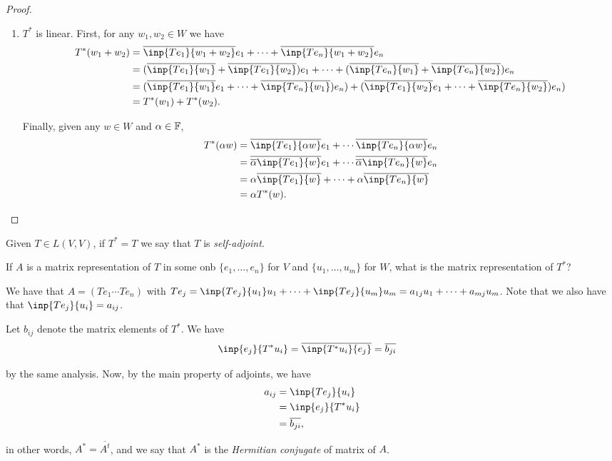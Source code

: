 \begin{proof}
\begin{enumerate}[{Step} 1)]
    \item $T^*$ is linear. First, for any $w_1,w_2\in W$ we have
    \begin{align*}
      T^*(w_1+w_2) &= \overline{\inp{Te_1}{w_1+w_2}}e_1 + \cdots + \overline{\inp{Te_n}{w_1+w_2}}e_n\\
      &= (\overline{\inp{Te_1}{w_1}}+\overline{\inp{Te_1}{w_2}})e_1 + \cdots + (\overline{\inp{Te_n}{w_1}}+\overline{\inp{Te_n}{w_2}})e_n\\
      &= (\overline{\inp{Te_1}{w_1}}e_1+\cdots+\overline{\inp{Te_n}{w_1}})e_n) + (\overline{\inp{Te_1}{w_2}}e_1+\cdots+\overline{\inp{Te_n}{w_2}})e_n)\\
      &= T^*(w_1) + T^*(w_2).
    \end{align*}

    Finally, given any $w\in W$ and $\alpha\in\mathbb{F}$,
    \begin{align*}
      T^*(\alpha w) &= \overline{\inp{Te_1}{\alpha w}}e_1 + \cdots \overline{\inp{Te_n}{\alpha w}}e_n\\
      &= \overline{\overline{\alpha} \inp{Te_1}{w}}e_1 + \cdots \overline{\overline{\alpha} \inp{Te_n}{w}}e_n\\
      &= \alpha\overline{\inp{Te_1}{w}} + \cdots + \alpha\overline{\inp{Te_n}{w}}\\
      &= \alpha T^*(w).
    \end{align*}
  \end{enumerate}
\end{proof}


\begin{definition}
  Given $T\in L(V,V)$, if $T^*=T$ we say that $T$ is \emph{self-adjoint}.
\end{definition}

\begin{question}
  If $A$ is a matrix representation of $T$ in some onb $\{e_1,\dots,e_n\}$ for $V$ and $\{u_1,\dots,u_m\}$ for $W$, what is the matrix representation of $T^*$?
\end{question}
\begin{answer}
  We have that $A=(Te_1 \cdots Te_n)$ with $Te_j=\inp{Te_j}{u_1}u_1 + \cdots + \inp{Te_j}{u_m}u_m =a_{1j}u_1 + \cdots + a_{mj}u_m$. Note that we also have that $\inp{Te_j}{u_i} = a_{ij}$.

  Let $b_{ij}$ denote the matrix elements of $T^*$. We have
  \begin{align*}
    \inp{e_j}{T^*u_i} &= \overline{\inp{T^*u_i}{e_j}} = \overline{b_{ji}}
  \end{align*}

  by the same analysis. Now, by the main property of adjoints, we have
  \begin{align*}
    a_{ij} &= \inp{Te_j}{u_i}\\
    &= \inp{e_j}{T^*u_i}\\
    &= \overline{b_{ji}},
  \end{align*}

  in other words, $A^*=\overline{A^t}$, and we say that $A^*$ is the \emph{Hermitian conjugate} of matrix of $A$.
\end{answer}


